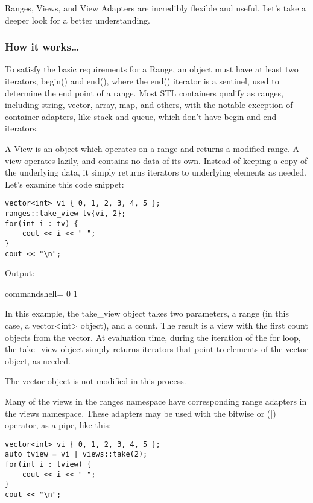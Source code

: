 Ranges, Views, and View Adapters are incredibly flexible and useful. Let's take a deeper look for a better understanding.

\subsubsection{How it works…}

To satisfy the basic requirements for a Range, an object must have at least two iterators, begin() and end(), where the end() iterator is a sentinel, used to determine the end point of a range. Most STL containers qualify as ranges, including string, vector, array, map, and others, with the notable exception of container-adapters, like stack and queue, which don't have begin and end iterators.

A View is an object which operates on a range and returns a modified range. A view operates lazily, and contains no data of its own. Instead of keeping a copy of the underlying data, it simply returns iterators to underlying elements as needed. Let's examine this code snippet:

\begin{lstlisting}[style=styleCXX]
vector<int> vi { 0, 1, 2, 3, 4, 5 };
ranges::take_view tv{vi, 2};
for(int i : tv) {
	cout << i << " ";
}
cout << "\n";
\end{lstlisting}

Output:

\begin{tcblisting}{commandshell={}}
0 1
\end{tcblisting}

In this example, the take\_view object takes two parameters, a range (in this case, a vector<int> object), and a count. The result is a view with the first count objects from the vector. At evaluation time, during the iteration of the for loop, the take\_view object simply returns iterators that point to elements of the vector object, as needed.

The vector object is not modified in this process.

Many of the views in the ranges namespace have corresponding range adapters in the views namespace. These adapters may be used with the bitwise or (|) operator, as a pipe, like this:

\begin{lstlisting}[style=styleCXX]
vector<int> vi { 0, 1, 2, 3, 4, 5 };
auto tview = vi | views::take(2);
for(int i : tview) {
	cout << i << " ";
}
cout << "\n";
\end{lstlisting}

